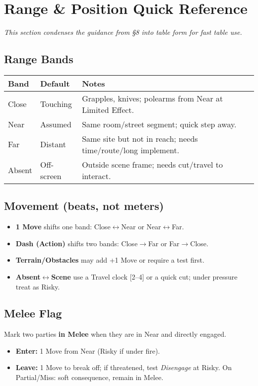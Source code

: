

\section{Range \& Position Quick Reference}
\label{sec:range-position-qr}
\textit{This section condenses the guidance from \S8 into table form for fast table use.}

\subsection{Range Bands}
\begin{center}
\begin{tabular}{@{}llp{8.5cm}@{}}
\toprule
\textbf{Band} & \textbf{Default} & \textbf{Notes} \\
\midrule
Close & Touching & Grapples, knives; polearms from Near at Limited Effect. \\
Near  & Assumed  & Same room/street segment; quick step away. \\
Far   & Distant  & Same site but not in reach; needs time/route/long implement. \\
Absent& Off-screen & Outside scene frame; needs cut/travel to interact. \\
\bottomrule
\end{tabular}
\end{center}

\subsection{Movement (beats, not meters)}
\begin{itemize}
  \item \textbf{1 Move} shifts one band: Close$\leftrightarrow$Near or Near$\leftrightarrow$Far.
  \item \textbf{Dash (Action)} shifts two bands: Close$\rightarrow$Far or Far$\rightarrow$Close.
  \item \textbf{Terrain/Obstacles} may add +1 Move or require a test first.
  \item \textbf{Absent$\leftrightarrow$Scene} use a Travel clock [2--4] or a quick cut; under pressure treat as Risky.
\end{itemize}

\subsection{Melee Flag}
Mark two parties \textbf{in Melee} when they are in Near and directly engaged.
\begin{itemize}
  \item \textbf{Enter:} 1 Move from Near (Risky if under fire).
  \item \textbf{Leave:} 1 Move to break off; if threatened, test \emph{Disengage} at Risky. On Partial/Miss: soft consequence, remain in Melee.
\end{itemize}

